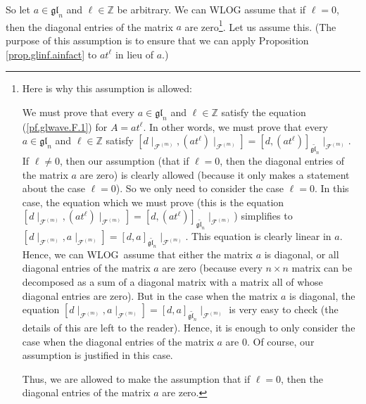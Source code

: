 \documentclass[etingof-lie.tex]{subfiles}
\begin{document}
So let $a\in\mathfrak{gl}_{n}$ and $\ell\in\mathbb{Z}$ be arbitrary. We can
WLOG assume that if $\ell=0$, then the diagonal entries of the matrix $a$ are
zero\footnote{Here is why this assumption is allowed:
\par
We must prove that every $a\in\mathfrak{gl}_{n}$ and $\ell\in\mathbb{Z}$
satisfy the equation (\ref{pf.glwave.F.1}) for $A=at^{\ell}$. In other words,
we must prove that every $a\in\mathfrak{gl}_{n}$ and $\ell\in\mathbb{Z}$
satisfy $\left[  d\mid_{\mathcal{F}^{\left(  m\right)  }},\left(  at^{\ell
}\right)  \mid_{\mathcal{F}^{\left(  m\right)  }}\right]  =\left[  d,\left(
at^{\ell}\right)  \right]  _{\widetilde{\mathfrak{gl}_{n}}}\mid_{\mathcal{F}%
^{\left(  m\right)  }}$. If $\ell\neq0$, then our assumption (that if $\ell
=0$, then the diagonal entries of the matrix $a$ are zero) is clearly allowed
(because it only makes a statement about the case $\ell=0$). So we only need
to consider the case $\ell=0$. In this case, the equation which we must prove
(this is the equation $\left[  d\mid_{\mathcal{F}^{\left(  m\right)  }%
},\left(  at^{\ell}\right)  \mid_{\mathcal{F}^{\left(  m\right)  }}\right]
=\left[  d,\left(  at^{\ell}\right)  \right]  _{\widetilde{\mathfrak{gl}_{n}}%
}\mid_{\mathcal{F}^{\left(  m\right)  }}$) simplifies to $\left[
d\mid_{\mathcal{F}^{\left(  m\right)  }},a\mid_{\mathcal{F}^{\left(  m\right)
}}\right]  =\left[  d,a\right]  _{\widetilde{\mathfrak{gl}_{n}}}%
\mid_{\mathcal{F}^{\left(  m\right)  }}$. This equation is clearly linear in
$a$. Hence, we can WLOG\ assume that either the matrix $a$ is diagonal, or all
diagonal entries of the matrix $a$ are zero (because every $n\times n$ matrix
can be decomposed as a sum of a diagonal matrix with a matrix all of whose
diagonal entries are zero). But in the case when the matrix $a$ is diagonal,
the equation $\left[  d\mid_{\mathcal{F}^{\left(  m\right)  }},a\mid
_{\mathcal{F}^{\left(  m\right)  }}\right]  =\left[  d,a\right]
_{\widetilde{\mathfrak{gl}_{n}}}\mid_{\mathcal{F}^{\left(  m\right)  }}$ is
very easy to check (the details of this are left to the reader). Hence, it is
enough to only consider the case when the diagonal entries of the matrix $a$
are $0$. Of course, our assumption is justified in this case.
\par
Thus, we are allowed to make the assumption that if $\ell=0$, then the
diagonal entries of the matrix $a$ are zero.}. Let us assume this. (The
purpose of this assumption is to ensure that we can apply Proposition
\ref{prop.glinf.ainfact} to $at^{\ell}$ in lieu of $a$.)
\end{document}
